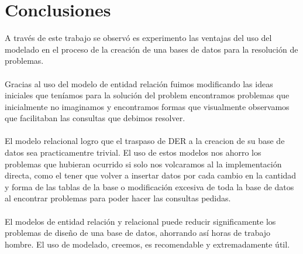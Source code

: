 \section{Conclusiones}

\noindent A través de este trabajo se observó es experimento las ventajas del uso del modelado en el proceso de la creación de una bases de datos para la resolución de problemas.\\\\
Gracias al uso del modelo de entidad relación fuimos modificando las ideas iniciales que teníamos para la solución del problem encontramos problemas que inicialmente no imaginamos y encontramos formas que visualmente observamos que facilitaban las consultas que debimos resolver.\\\\
El modelo relacional logro que el traspaso de DER a la creacion de su base de datos sea practicamentre trivial. El uso de estos modelos nos ahorro los problemas que hubieran ocurrido si solo nos volcaramos al la implementación directa, como el tener que volver a insertar datos por cada cambio en la cantidad y forma de las tablas de la base o modificación excesiva de toda la base de datos al encontrar problemas para poder hacer las consultas pedidas.\\\\
El modelos de entidad relación y relacional puede reducir significamente los problemas de diseño de una base de datos, ahorrando así horas de trabajo hombre. El uso de modelado, creemos, es recomendable y extremadamente útil. 
